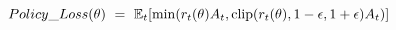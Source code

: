 $$Policy\_Loss(\theta) \ = \ \mathbb{E}_t[\min(r_t(\theta)A_t, {\rm clip}(r_t(\theta), 1 - \epsilon, 1 + \epsilon)A_t)]$$


